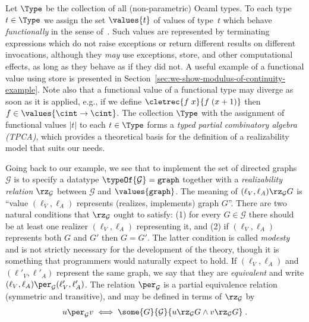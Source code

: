 Let $\Type$ be the collection of all (non-parametric) Ocaml types. To
each type $t \in \Type$ we assign the set $\values{t}$ of values of
type~$t$ which behave \emph{functionally} in the sense
of~\cite{longley99when}. Such values are represented by terminating
expressions which do not raise exceptions or return different results
on different invocations, although they \emph{may} use exceptions,
store, and other computational effects, as long as they behave as if
they did not. A useful example of a functional value using store is
presented in Section~\ref{sec:we-show-modulus-of-continuity-example}.
Note also that a functional value of a functional type may diverge as
soon as it is applied, e.g., if we define $\cletrec{f\;x}{f\;(x+1)}$
then $f \in \values{\cint \to \cint}$. The collection $\Type$ with the
assignment of functional values $|t|$ to each $t \in \Type$ forms a
\emph{typed partial combinatory algebra (TPCA)}, which provides a
theoretical basis for the definition of a realizability model that
suits our needs.

Going back to our example, we see that to implement the set of
directed graphs $\mathcal{G}$ is to specify a datatype
$\typeOf{\mathcal{G}} = \mathtt{graph}$ together with a
\emph{realizability relation} $\rz_{\mathcal{G}}$ between
$\mathcal{G}$ and $\values{\mathtt{graph}}$. The meaning of
$(\ell_V, \ell_A) \rz_\mathcal{G} G$ is ``value $(\ell_V, \ell_A)$
represents (realizes, implements) graph $G$''. There are two natural
conditions that $\rz_\mathcal{G}$ ought to satisfy: (1) for every $G
\in \mathcal{G}$ there should be at least one realizer $(\ell_V,
\ell_A)$ representing it, and (2) if $(\ell_V, \ell_A)$ represents
both $G$ and $G'$ then $G = G'$. The latter condition is called
\emph{modesty} and is not strictly necessary for the development of
the theory, though it is something that programmers would naturally
expect to hold. If $(\ell_V, \ell_A)$ and $(\ell'_V, \ell'_A)$
represent the same graph, we say that they are \emph{equivalent} and
write $(\ell_V, \ell_A) \per_\mathcal{G} (\ell'_V, \ell'_A)$. The
relation $\per_\mathcal{G}$ is a partial equivalence relation
(symmetric and transitive), and may be defined in terms of
$\rz_\mathcal{G}$ by
%
\begin{equation*}
  u \per_\mathcal{G} v
  \iff
  \some{G}{\mathcal{G}}{u \rz_\mathcal{G} G \land v \rz_\mathcal{G} G}
  \;.
\end{equation*}


